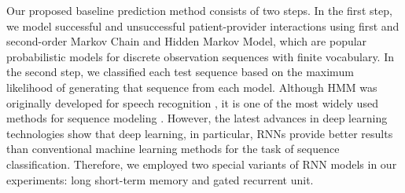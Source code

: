 \documentclass{amia_summit_2018}
\begin{document}
Our proposed baseline prediction method consists of two steps. In the first step, we model successful and unsuccessful patient-provider interactions using first and second-order Markov Chain and Hidden Markov Model, which are popular probabilistic models for discrete observation sequences with finite vocabulary. In the second step, we classified each test sequence based on the maximum likelihood of generating that sequence from each model. Although HMM was originally developed for speech recognition \cite{rabiner1989tutorial}, it is one of the most widely used methods for sequence modeling \cite{mutsam2016maximum, won2004training}. However, the latest advances in deep learning technologies show that deep learning, in particular, RNNs provide better results than conventional machine learning methods for the task of sequence classification. Therefore, we employed two special variants of RNN models in our experiments: long short-term memory and gated recurrent unit.
\end{document}
